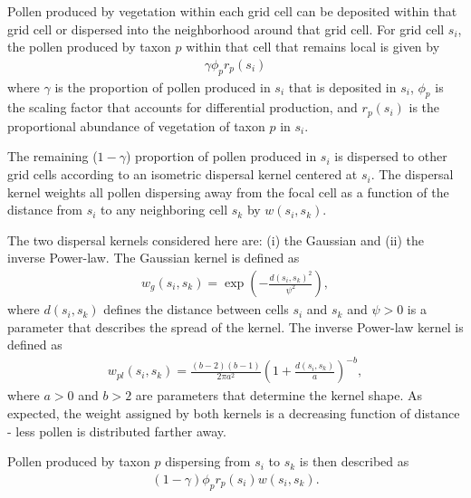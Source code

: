 \documentclass[12pt]{article}
\begin{document}
Pollen produced by vegetation within each grid cell can be deposited
within that grid cell or dispersed into the neighborhood around that
grid cell. For grid cell $s_i$, the pollen produced by taxon $p$
within that cell that remains local is given by
\begin{align}
\gamma \phi_p r_p(s_i)
\end{align} 
where $\gamma$ is the proportion of pollen produced in $s_i$ that is
deposited in $s_i$, $\phi_p$ is the scaling factor that accounts for
differential production, and $r_p(s_i)$ is the proportional abundance
of vegetation of taxon $p$ in $s_i$.

The remaining ($1-\gamma$) proportion of pollen produced in $s_i$ is
dispersed to other grid cells according to an isometric dispersal
kernel centered at $s_i$. The dispersal kernel weights all pollen
dispersing away from the focal cell as a function of the distance from
$s_i$ to any neighboring cell $s_k$ by $w(s_i, s_k)$.

The two dispersal kernels considered here are: (i) the Gaussian and
(ii) the inverse Power-law. The Gaussian kernel is defined as 
\begin{align}
  w_g(s_i, s_k) = \exp\left( - \frac{d(s_i, s_k)^2}{\psi^2} \right),
\end{align}
where $d(s_i,s_k)$ defines the distance between cells $s_i$ and $s_k$
and $\psi>0$ is a parameter that describes the spread of the
kernel. The inverse Power-law kernel is defined as
\begin{align}
w_{pl}(s_i, s_k) = \frac{(b-2)(b-1)}{2 \pi a^2} \left( 1 + \frac{d(s_i, s_k)}{a} \right)^{-b},
\end{align}
where $a>0$ and $b>2$ are parameters that determine the kernel
shape. As expected, the weight assigned by both kernels is a
decreasing function of distance - less pollen is distributed farther
away.

 
Pollen produced by taxon $p$ dispersing from $s_i$ to $s_k$ is then
described as
\begin{align}
(1-\gamma) \phi_p r_p(s_i) w(s_i, s_k).
\end{align}

\end{document}
